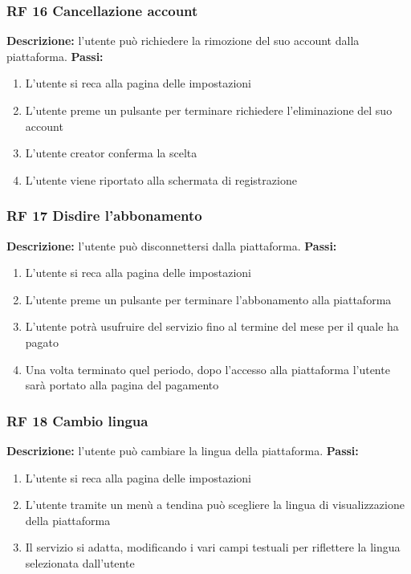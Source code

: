 \documentclass[a4paper,12pt]{article}
\begin{document}
\subsubsection*{RF 16 Cancellazione account}

\textbf{Descrizione:} l’utente può richiedere la rimozione del suo account dalla piattaforma. \newline
\textbf{Passi:}
\begin{enumerate}
    \item L’utente si reca alla pagina delle impostazioni
    \item L’utente preme un pulsante per terminare richiedere l'eliminazione del suo account
    \item L’utente creator conferma la scelta
    \item L'utente viene riportato alla schermata di registrazione
\end{enumerate}

\subsubsection*{RF 17 Disdire l'abbonamento}

\textbf{Descrizione:} l’utente può disconnettersi dalla piattaforma. \newline
\textbf{Passi:}
\begin{enumerate}
    \item L’utente si reca alla pagina delle impostazioni
    \item L’utente preme un pulsante per terminare l’abbonamento alla piattaforma
    \item L’utente potrà usufruire del servizio fino al termine del mese per il quale ha pagato
    \item Una volta terminato quel periodo, dopo l’accesso alla piattaforma l’utente sarà portato alla pagina del pagamento
\end{enumerate}

\subsubsection*{RF 18 Cambio lingua}

\textbf{Descrizione:}  l’utente può cambiare la lingua della piattaforma. \newline
\textbf{Passi:}
\begin{enumerate}
    \item L'utente si reca alla pagina delle impostazioni
    \item L’utente tramite un menù a tendina può scegliere la lingua di visualizzazione della piattaforma
    \item Il servizio si adatta, modificando i vari campi testuali per riflettere la lingua selezionata dall’utente
\end{enumerate}
\end{document}
